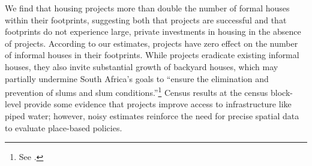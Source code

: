 \documentclass[12pt]{article}
\begin{document}






We find that housing projects more than double the number of formal houses within their footprints, suggesting both that projects are  successful and that footprints do not experience large, private investments in housing in the absence of projects.  According to our estimates, projects have zero effect on the number of informal houses in their footprints.  While projects eradicate existing informal houses, they also invite substantial growth of backyard houses, which may partially undermine South Africa's goals to ``ensure the elimination and prevention of slums and slum conditions.''\footnote{See \cite{housingact}.}  Census results at the census block-level provide some evidence that projects improve access to infrastructure like piped water; however, noisy estimates reinforce the need for precise spatial data to evaluate place-based policies.  
\end{document}
